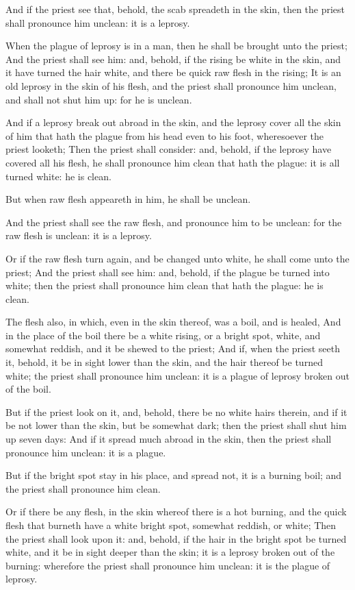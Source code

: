 \verse And if the priest see that, behold, the scab spreadeth in the skin, then the priest shall pronounce him unclean: it is a leprosy.

\verse When the plague of leprosy is in a man, then he shall be brought unto the priest; \verse And the priest shall see him: and, behold, if the rising be white in the skin, and it have turned the hair white, and there be quick raw flesh in the rising; \verse It is an old leprosy in the skin of his flesh, and the priest shall pronounce him unclean, and shall not shut him up: for he is unclean.

\verse And if a leprosy break out abroad in the skin, and the leprosy cover all the skin of him that hath the plague from his head even to his foot, wheresoever the priest looketh; \verse Then the priest shall consider: and, behold, if the leprosy have covered all his flesh, he shall pronounce him clean that hath the plague: it is all turned white: he is clean.

\verse But when raw flesh appeareth in him, he shall be unclean.

\verse And the priest shall see the raw flesh, and pronounce him to be unclean: for the raw flesh is unclean: it is a leprosy.

\verse Or if the raw flesh turn again, and be changed unto white, he shall come unto the priest; \verse And the priest shall see him: and, behold, if the plague be turned into white; then the priest shall pronounce him clean that hath the plague: he is clean.

\verse The flesh also, in which, even in the skin thereof, was a boil, and is healed, \verse And in the place of the boil there be a white rising, or a bright spot, white, and somewhat reddish, and it be shewed to the priest; \verse And if, when the priest seeth it, behold, it be in sight lower than the skin, and the hair thereof be turned white; the priest shall pronounce him unclean: it is a plague of leprosy broken out of the boil.

\verse But if the priest look on it, and, behold, there be no white hairs therein, and if it be not lower than the skin, but be somewhat dark; then the priest shall shut him up seven days: \verse And if it spread much abroad in the skin, then the priest shall pronounce him unclean: it is a plague.

\verse But if the bright spot stay in his place, and spread not, it is a burning boil; and the priest shall pronounce him clean.

\verse Or if there be any flesh, in the skin whereof there is a hot burning, and the quick flesh that burneth have a white bright spot, somewhat reddish, or white; \verse Then the priest shall look upon it: and, behold, if the hair in the bright spot be turned white, and it be in sight deeper than the skin; it is a leprosy broken out of the burning: wherefore the priest shall pronounce him unclean: it is the plague of leprosy.

